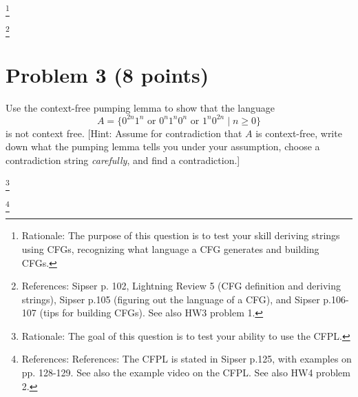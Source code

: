\documentclass[letterpaper,11pt,twoside]{article}
\theoremstyle{plain}
\theoremstyle{definition}
\theoremstyle{remark}
\theoremstyle{restate}
\newcommand\blfootnote[1]{%
  \begingroup
  \renewcommand\thefootnote{}\footnote{#1}%
  \addtocounter{footnote}{-1}%
  \endgroup
}
\begin{document}
    \blfootnote{ Rationale: The purpose of this question is to test your skill deriving strings using CFGs, recognizing what language a CFG generates and building CFGs. }
    \blfootnote{ References: Sipser p. 102, Lightning Review 5 (CFG definition and deriving strings), Sipser p.105 (figuring out the language of a CFG), and Sipser p.106-107 (tips for building CFGs). See also HW3 problem 1.}



\clearpage
\section{Problem 3 (8 points)}
    Use the context-free pumping lemma to show that the language
    \[
        A = \{  0^{2n}1^n \text{ or } 0^n1^n0^n \text{ or } 1^n0^{2n} \; | \; n \geq 0 \}
    \]
    is not context free. [Hint: Assume for contradiction that $A$ is context-free, write down what the pumping lemma tells you under your assumption, choose a contradiction string \emph{carefully}, and find a contradiction.]
    
    \blfootnote{ Rationale: The goal of this question is to test your ability to use the CFPL. }
    \blfootnote{ References: References: The CFPL is stated in Sipser p.125, with examples on pp. 128-129. See also the example video on the CFPL. See also HW4 problem 2. }
    
\clearpage
\end{document}
